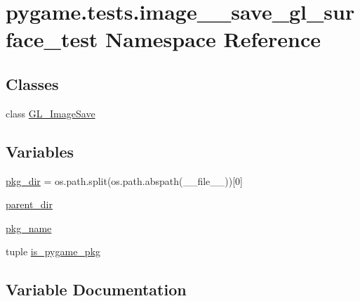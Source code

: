 \hypertarget{namespacepygame_1_1tests_1_1image____save__gl__surface__test}{}\section{pygame.\+tests.\+image\+\_\+\+\_\+save\+\_\+gl\+\_\+surface\+\_\+test Namespace Reference}
\label{namespacepygame_1_1tests_1_1image____save__gl__surface__test}
\subsection*{Classes}
\begin{DoxyCompactItemize}
\item 
class \hyperlink{classpygame_1_1tests_1_1image____save__gl__surface__test_1_1_g_l___image_save}{G\+L\+\_\+\+Image\+Save}
\end{DoxyCompactItemize}
\subsection*{Variables}
\begin{DoxyCompactItemize}
\item 
\hyperlink{namespacepygame_1_1tests_1_1image____save__gl__surface__test_aadd840ce033e30e8d7aaddfa26a81f9f}{pkg\+\_\+dir} = os.\+path.\+split(os.\+path.\+abspath(\+\_\+\+\_\+file\+\_\+\+\_\+))\mbox{[}0\mbox{]}
\item 
\hyperlink{namespacepygame_1_1tests_1_1image____save__gl__surface__test_abc71638c53b46585dfbf37a3e73ab38a}{parent\+\_\+dir}
\item 
\hyperlink{namespacepygame_1_1tests_1_1image____save__gl__surface__test_aea8d8d7abf6f95bd90f3143c6f3953ed}{pkg\+\_\+name}
\item 
tuple \hyperlink{namespacepygame_1_1tests_1_1image____save__gl__surface__test_af0234595fe156ea019e8a0cbbfd283a0}{is\+\_\+pygame\+\_\+pkg}
\end{DoxyCompactItemize}


\subsection{Variable Documentation}
\mbox{\label{namespacepygame_1_1tests_1_1image____save__gl__surface__test_af0234595fe156ea019e8a0cbbfd283a0}} 

